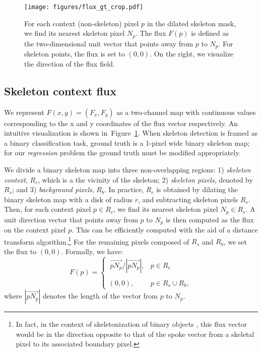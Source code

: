 \documentclass[10pt,twocolumn,letterpaper]{article}
\newcommand{\reffig}[1]{Figure~\ref{#1}}
\begin{document}
\begin{figure}
\centering
\texttt{[image: figures/flux\_gt\_crop.pdf]}
\vskip 0.2cm
\caption{For each context (non-skeleton) pixel $p$ in the dilated skeleton mask, we find its nearest skeleton pixel $N_p$. The flux $F(p)$ is defined as the two-dimensional unit vector that points away from $p$ to $N_p$. For skeleton points, the flux is set to $(0, 0)$. On the right, we visualize the direction of the flux field.}
\label{fig:directionfield}
\end{figure}

\subsection{Skeleton context flux} \label{sec:directionfield}
We represent $F(x,y) = (F_x, F_y)$ as a two-channel map with continuous values corresponding to the x and y coordinates of the flux vector respectively.
An intuitive visualization is shown in~\reffig{fig:directionfield}.
When skeleton detection is framed as a binary classification task, ground truth is a 1-pixel wide binary skeleton map; for our \emph{regression} problem the ground truth must be modified appropriately.

We divide a binary skeleton map into three non-overlapping regions: 1) {\it skeleton context}, $R_c$, which is a the vicinity of the skeleton; 2) {\it skeleton pixels}, denoted by $R_s$; and 3) {\it background pixels}, $R_b$. In practice, $R_c$ is obtained by dilating the binary skeleton map with a disk of radius $r$, and subtracting skeleton pixels $R_s$. Then, for each context pixel $p \in R_c$, we find its nearest skeleton pixel $N_p \in R_s$. A unit direction vector that points away from $p$ to $N_p$ is then computed as the flux on the context pixel $p$.
This can be efficiently computed with the aid of a distance transform algorithm.\footnote{In fact, in the context of skeletonization of binary objects \cite{siddiqi2008}, this flux vector would be in the direction opposite to that of the spoke vector from a skeletal pixel to its associated boundary pixel.} For the remaining pixels composed of $R_s$ and $R_b$, we set the flux to $(0, 0)$. Formally, we have:
\begin{equation}
F(p) =
\left\{
\begin{matrix} \
\overrightarrow{p N_p}/\left\vert\overrightarrow{p N_p}\right\vert, & p\in R_c  \\ \\
(0,0), & p \in R_s \cup R_b,
\end{matrix}
\right.
\label{eq:sklrep}
\end{equation}
where $\left\vert\overrightarrow{p N_p}\right\vert$ denotes the length of the vector from $p$ to $N_p$.
\end{document}
